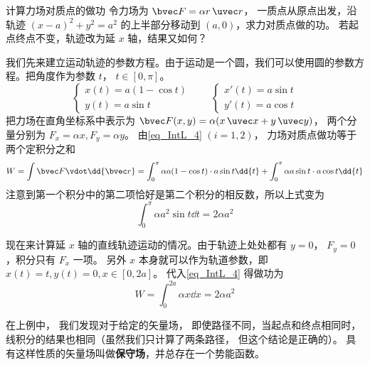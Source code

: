\begin{example}{计算力场对质点的做功}\label{ex_IntL_1}
令力场为 $\bvec F = \alpha r \,\uvec r$， 一质点从原点出发，沿轨迹 $(x-a)^2 + y^2 = a^2$ 的上半部分移动到 $(a,0)$，求力对质点做的功。 若起点终点不变，轨迹改为延 $x$ 轴，结果又如何？

我们先来建立运动轨迹的参数方程。由于运动是一个圆，我们可以使用圆的参数方程。把角度作为参数 $t$， $t\in [0,\pi]$。
\begin{equation}
\begin{cases}
x(t) = a(1-\cos t)\\
y(t) = a \sin t
\end{cases}
\qquad 
\begin{cases}
x'(t) = a \sin t\\
y'(t) = a \cos t
\end{cases}
\end{equation}
把力场在直角坐标系中表示为 $\bvec F(x,y) = \alpha (x\,\uvec x + y\,\uvec y)$， 两个分量分别为 $F_x = \alpha x, F_y = \alpha y$。 由\autoref{eq_IntL_4} $(i=1,2)$， 力场对质点做功等于两个定积分之和
\begin{equation}
W = \int \bvec F \vdot \dd{\bvec r} =\int_0^\pi \alpha a(1-\cos t) \cdot a \sin t \dd{t} + \int_0^\pi \alpha a \sin t \cdot a \cos t \dd{t}
\end{equation}
注意到第一个积分中的第二项恰好是第二个积分的相反数，所以上式变为
\begin{equation}
\int_0^\pi \alpha a^2 \sin t \dd{t} =2 \alpha a^2
\end{equation}

现在来计算延 $x$ 轴的直线轨迹运动的情况。由于轨迹上处处都有 $y=0$， $F_y = 0$，积分只有 $F_x$ 一项。 另外 $x$ 本身就可以作为轨道参数，即 $x(t) = t, y(t) = 0, x\in [0, 2a]$。 代入\autoref{eq_IntL_4} 得做功为
\begin{equation}
W = \int_0^{2a} \alpha x \dd{x} = 2 \alpha a^2
\end{equation}
\end{example}

在上例中， 我们发现对于给定的矢量场， 即使路径不同，当起点和终点相同时， 线积分的结果也相同（虽然我们只计算了两条路径， 但这个结论是正确的）。 具有这样性质的矢量场叫做\textbf{保守场}，并总存在一个势能函数。 

